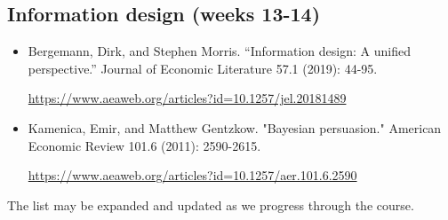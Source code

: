 \documentclass{article}
\begin{document}
\subsection{Information design (weeks 13-14)}
\begin{itemize}
	\item Bergemann, Dirk, and Stephen Morris. ``Information design: A unified perspective.'' Journal of Economic Literature 57.1 (2019): 44-95. 
	
	\url{https://www.aeaweb.org/articles?id=10.1257/jel.20181489}
%	
	\item Kamenica, Emir, and Matthew Gentzkow. "Bayesian persuasion." American Economic Review 101.6 (2011): 2590-2615.
	
	\url{https://www.aeaweb.org/articles?id=10.1257/aer.101.6.2590}
\end{itemize}

\bigskip
The list may be expanded and updated as we progress through the course.


\end{document}
